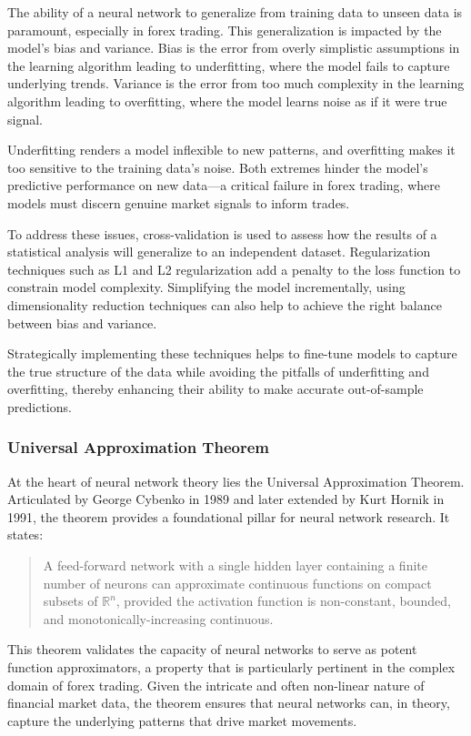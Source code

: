 The ability of a neural network to generalize from training data to unseen data is paramount, especially in forex trading. This generalization is impacted by the model's bias and variance. Bias is the error from overly simplistic assumptions in the learning algorithm leading to underfitting, where the model fails to capture underlying trends. Variance is the error from too much complexity in the learning algorithm leading to overfitting, where the model learns noise as if it were true signal.

Underfitting renders a model inflexible to new patterns, and overfitting makes it too sensitive to the training data's noise. Both extremes hinder the model's predictive performance on new data—a critical failure in forex trading, where models must discern genuine market signals to inform trades.

To address these issues, cross-validation is used to assess how the results of a statistical analysis will generalize to an independent dataset. Regularization techniques such as L1 and L2 regularization add a penalty to the loss function to constrain model complexity. Simplifying the model incrementally, using dimensionality reduction techniques can also help to achieve the right balance between bias and variance.

Strategically implementing these techniques helps to fine-tune models to capture the true structure of the data while avoiding the pitfalls of underfitting and overfitting, thereby enhancing their ability to make accurate out-of-sample predictions.

\subsubsection{Universal Approximation Theorem}

At the heart of neural network theory lies the Universal Approximation Theorem. Articulated by George Cybenko in 1989 and later extended by Kurt Hornik in 1991, the theorem provides a foundational pillar for neural network research. It states:

\begin{quote}
A feed-forward network with a single hidden layer containing a finite number of neurons can approximate continuous functions on compact subsets of \( \mathbb{R}^n \), provided the activation function is non-constant, bounded, and monotonically-increasing continuous.
\end{quote}

This theorem validates the capacity of neural networks to serve as potent function approximators, a property that is particularly pertinent in the complex domain of forex trading. Given the intricate and often non-linear nature of financial market data, the theorem ensures that neural networks can, in theory, capture the underlying patterns that drive market movements.

